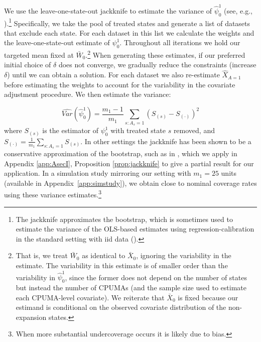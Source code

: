 \documentclass[aoas]{imsart}
\theoremstyle{plain}
\theoremstyle{remark}
\begin{document}
We use the leave-one-state-out jackknife to estimate the variance of $\hat{\psi}_0^1$ (see, e.g., \cite{cameron2015practitioner}).\footnote{The jackknife approximates the bootstrap, which is sometimes used to estimate the variance of the OLS-based estimates using regression-calibration in the standard setting with iid data (\cite{carroll2006measurement}).} Specifically, we take the pool of treated states and generate a list of datasets that exclude each state. For each dataset in this list we calculate the weights and the leave-one-state-out estimate of $\psi_0^1$. Throughout all iterations we hold our targeted mean fixed at $\bar{W}_0$.\footnote{That is, we treat $\bar{W}_0$ as identical to $\bar{X}_0$, ignoring the variability in the estimate. The variability in this estimate is of smaller order than the variability in $\hat{\psi}_0^1$, since the former does not depend on the number of states but instead the number of CPUMAs (and the sample size used to estimate each CPUMA-level covariate). We reiterate that $\bar{X}_0$ is fixed because our estimand is conditional on the observed covariate distribution of the non-expansion states.} When generating these estimates, if our preferred initial choice of $\delta$ does not converge, we gradually reduce the constraints (increase $\delta$) until we can obtain a solution. For each dataset we also re-estimate $\hat{X}_{A=1}$ before estimating the weights to account for the variability in the covariate adjustment procedure. We then estimate the variance:

\begin{equation}\label{eqn:jackknife}
 \hat{Var}(\hat{\psi}_0^1) = \frac{m_1 - 1}{m_1} \sum_{s:A_s = 1} \left( S_{(s)} - S_{(\cdot)} \right)^2
\end{equation}
%
where $S_{(s)}$ is the estimator of $\psi_0^1$ with treated state $s$ removed, and $S_{(\cdot)} = \frac{1}{m_1} \sum_{s:A_s=1} S_{(s)}$. In other settings the jackknife has been shown to be a conservative approximation of the bootstrap, such as in \cite{efron1981jackknife}, which we apply in Appendix \ref{app:AsecI}, Proposition \ref{prop:jackknife} to give a partial result for our application. In a simulation study mirroring our setting with $m_1 = 25$ units (available in Appendix~\ref{app:simstudy}), we obtain close to nominal coverage rates using these variance estimates.\footnote{When more substantial undercoverage occurs it is likely due to bias.}
\end{document}
